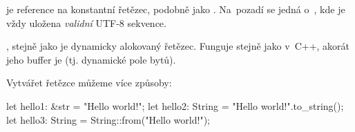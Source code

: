 \documentclass[main.tex]{subfiles}
\begin{document}
 je reference na konstantní řetězec, podobně jako .
Na~pozadí se jedná o~\irust{&[u8]}, kde je vždy uložena \emph{validní} UTF-8 sekvence.

, stejně jako  je dynamicky alokovaný řetězec. Funguje
stejně jako v~C++, akorát jeho buffer je  (tj. dynamické pole bytů).

Vytvářet řetězce můžeme více způsoby:

\obrazek
\begin{rustcode}
    let hello1: &str = "Hello world!";
    let hello2: String = "Hello world!".to_string();
    let hello3: String = String::from("Hello world!");
\end{rustcode}


\end{document}
